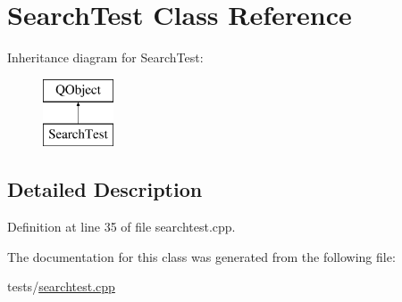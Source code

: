 \hypertarget{classSearchTest}{\section{Search\+Test Class Reference}
\label{classSearchTest}
}
Inheritance diagram for Search\+Test\+:\begin{figure}[H]
\begin{center}
\leavevmode
\includegraphics[height=2.000000cm]{classSearchTest}
\end{center}
\end{figure}


\subsection{Detailed Description}


Definition at line 35 of file searchtest.\+cpp.



The documentation for this class was generated from the following file\+:\begin{DoxyCompactItemize}
\item 
tests/\hyperlink{searchtest_8cpp}{searchtest.\+cpp}\end{DoxyCompactItemize}
